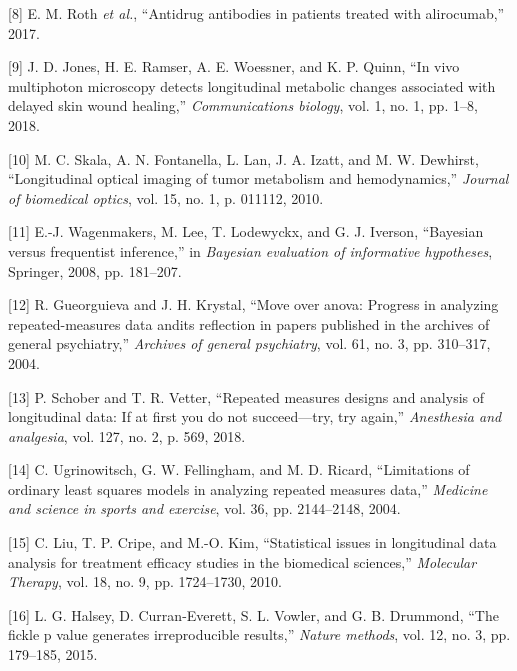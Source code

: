 \documentclass[
]{article}
\begin{document}
\leavevmode\hypertarget{ref-roth2017}{}%
{[}8{]} E. M. Roth \emph{et al.}, ``Antidrug antibodies in patients treated with alirocumab,'' 2017.

\leavevmode\hypertarget{ref-jones2018}{}%
{[}9{]} J. D. Jones, H. E. Ramser, A. E. Woessner, and K. P. Quinn, ``In vivo multiphoton microscopy detects longitudinal metabolic changes associated with delayed skin wound healing,'' \emph{Communications biology}, vol. 1, no. 1, pp. 1--8, 2018.

\leavevmode\hypertarget{ref-skala2010}{}%
{[}10{]} M. C. Skala, A. N. Fontanella, L. Lan, J. A. Izatt, and M. W. Dewhirst, ``Longitudinal optical imaging of tumor metabolism and hemodynamics,'' \emph{Journal of biomedical optics}, vol. 15, no. 1, p. 011112, 2010.

\leavevmode\hypertarget{ref-wagenmakers2008}{}%
{[}11{]} E.-J. Wagenmakers, M. Lee, T. Lodewyckx, and G. J. Iverson, ``Bayesian versus frequentist inference,'' in \emph{Bayesian evaluation of informative hypotheses}, Springer, 2008, pp. 181--207.

\leavevmode\hypertarget{ref-gueorguieva2004}{}%
{[}12{]} R. Gueorguieva and J. H. Krystal, ``Move over anova: Progress in analyzing repeated-measures data andits reflection in papers published in the archives of general psychiatry,'' \emph{Archives of general psychiatry}, vol. 61, no. 3, pp. 310--317, 2004.

\leavevmode\hypertarget{ref-schober2018}{}%
{[}13{]} P. Schober and T. R. Vetter, ``Repeated measures designs and analysis of longitudinal data: If at first you do not succeed---try, try again,'' \emph{Anesthesia and analgesia}, vol. 127, no. 2, p. 569, 2018.

\leavevmode\hypertarget{ref-ugrinowitsch2004}{}%
{[}14{]} C. Ugrinowitsch, G. W. Fellingham, and M. D. Ricard, ``Limitations of ordinary least squares models in analyzing repeated measures data,'' \emph{Medicine and science in sports and exercise}, vol. 36, pp. 2144--2148, 2004.

\leavevmode\hypertarget{ref-liu2010}{}%
{[}15{]} C. Liu, T. P. Cripe, and M.-O. Kim, ``Statistical issues in longitudinal data analysis for treatment efficacy studies in the biomedical sciences,'' \emph{Molecular Therapy}, vol. 18, no. 9, pp. 1724--1730, 2010.

\leavevmode\hypertarget{ref-halsey2015}{}%
{[}16{]} L. G. Halsey, D. Curran-Everett, S. L. Vowler, and G. B. Drummond, ``The fickle p value generates irreproducible results,'' \emph{Nature methods}, vol. 12, no. 3, pp. 179--185, 2015.
\end{document}
